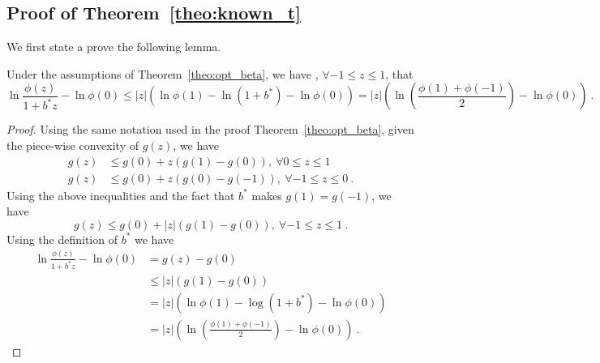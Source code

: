 \subsection{Proof of Theorem~\ref{theo:known_t}}
We first state a prove the following lemma.
\begin{lemma}
\label{lemma:bound_ratio}
Under the assumptions of Theorem~\ref{theo:opt_beta}, we have , $\forall -1 \leq z\leq 1$, that 
\[
\ln \frac{\phi(z)}{1+b^* z} - \ln \phi(0)\leq  |z| \left(\ln \phi(1) - \ln (1+b^*)- \ln \phi(0)\right) =  |z| \left(\ln \left(\frac{\phi(1)+\phi(-1)}{2}\right)- \ln \phi(0)\right)~.
\]
\end{lemma}
\begin{proof}
Using the same notation used in the proof Theorem~\ref{theo:opt_beta}, given the piece-wise convexity of $g(z)$, we have
\begin{align*}
g(z) &\leq g(0) + z (g(1)-g(0)), \ \forall 0 \leq z\leq 1 \\
g(z) &\leq g(0) + z (g(0)-g(-1)), \ \forall -1 \leq z\leq 0~.
\end{align*}
Using the above inequalities and the fact that $b^*$ makes $g(1)=g(-1)$, we have
\[
g(z) \leq g(0) + |z| (g(1)-g(0)), \ \forall -1 \leq z\leq 1~.
\]
Using the definition of $b^*$ we have
\begin{align*}
\ln \frac{\phi(z)}{1+b^* z} - \ln \phi(0)
&= g(z) - g(0) \\
& \leq |z| (g(1)-g(0)) \\
& = |z| \left(\ln \phi(1) - \log(1+b^*) - \ln \phi(0)\right) \\
& = |z| \left(\ln\left(\frac{\phi(1)+\phi(-1)}{2}\right) - \ln \phi(0)\right)~.
\end{align*}
\end{proof}

